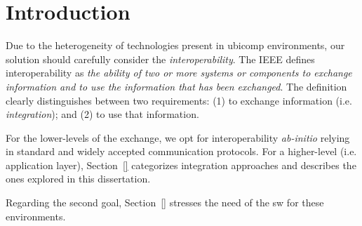 \section{Introduction}
\label{sec:soa_intro}

Due to the heterogeneity of technologies present in \ac{ubicomp} environments, %
our solution should carefully consider the \emph{interoperability}.
The IEEE defines interoperability as \emph{the ability of two or more systems or components to exchange information and to use the information that has been exchanged}.
The definition clearly distinguishes between two requirements: %
(1) to exchange information (i.e. \emph{integration}); and
(2) to use that information. %


For the lower-levels of the exchange, we opt for interoperability \emph{ab-initio} relying in standard and widely accepted communication protocols. %
For a higher-level (i.e. application layer), Section~\ref{} categorizes integration approaches and describes the ones explored in this dissertation.

Regarding the second goal, 
Section~\ref{} stresses the need of the \acl{sw} for these environments.





